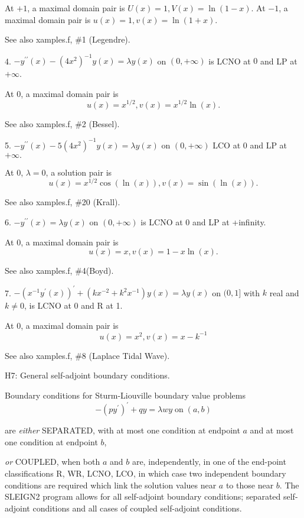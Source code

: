 \documentclass[12pt]{amsart}%
\theoremstyle{plain}
\numberwithin{equation}{section}
\numberwithin{theorem}{section}
\begin{document}
At $+1$, a maximal domain pair is $U(x)=1,V(x)=\ln(1-x)$. At $-1$, a maximal
domain pair is $u(x)=1,v(x)=\ln(1+x).$

See also xamples.f, \#1 (Legendre).

4. $-y^{\prime\prime}(x)-(4x^{2})^{-1}y(x)=\lambda y(x)$ on $(0,+\infty)$ is
LCNO at $0$ and LP at $+\infty$.

At $0$, a maximal domain pair is%
\[
u(x)=x^{1/2},v(x)=x^{1/2}\ln(x).
\]

See also xamples.f, \#2 (Bessel).

5. $-y^{\prime\prime}(x)-5(4x^{2})^{-1}y(x)=\lambda y(x)$ on $(0,+\infty)$ LCO
at $0$ and LP at $+\infty.$

At $0$, $\lambda=0$, a solution pair is%
\[
u(x)=x^{1/2}\cos(\ln(x)),v(x)=\sin(\ln(x)).
\]

See also xamples.f, \#20 (Krall).

6. $-y^{\prime\prime}(x)=\lambda y(x)$ on $(0,+\infty)$ is LCNO at 0 and LP at +infinity.

At $0$, a maximal domain pair is%
\[
u(x)=x,v(x)=1-x\ln(x).
\]

See also xamples.f, \#4(Boyd).

7. $-(x^{-1}y^{\prime}(x))^{\prime}+(kx^{-2}+k^{2}x^{-1})y(x)=\lambda y(x)$ on
$(0,1]$ with $k$ real and $k\neq0$, is LCNO at 0 and R at 1.

At $0$, a maximal domain pair is%
\[
u(x)=x^{2},v(x)=x-k^{-1}%
\]

See also xamples.f, \#8 (Laplace Tidal Wave).

\medskip

H7: General self-adjoint boundary conditions.

Boundary conditions for Sturm-Liouville boundary value problems%
\begin{equation}
-(py^{\prime})^{\prime}+qy=\lambda wy\;\text{on}\;(a,b) \tag{*}%
\end{equation}

\noindent are \textit{either }SEPARATED, with at most one condition at
endpoint $a$ and at most one condition at endpoint $b$,

\noindent\textit{or }COUPLED, when both $a$ and $b$ are, independently, in one
of the end-point classifications R, WR, LCNO, LCO, in which case two
independent boundary conditions are required which link the solution values
near $a$ to those near $b$. The SLEIGN2 program allows for all self-adjoint
boundary conditions; separated self-adjoint conditions and all cases of
coupled self-adjoint conditions.
\end{document}
